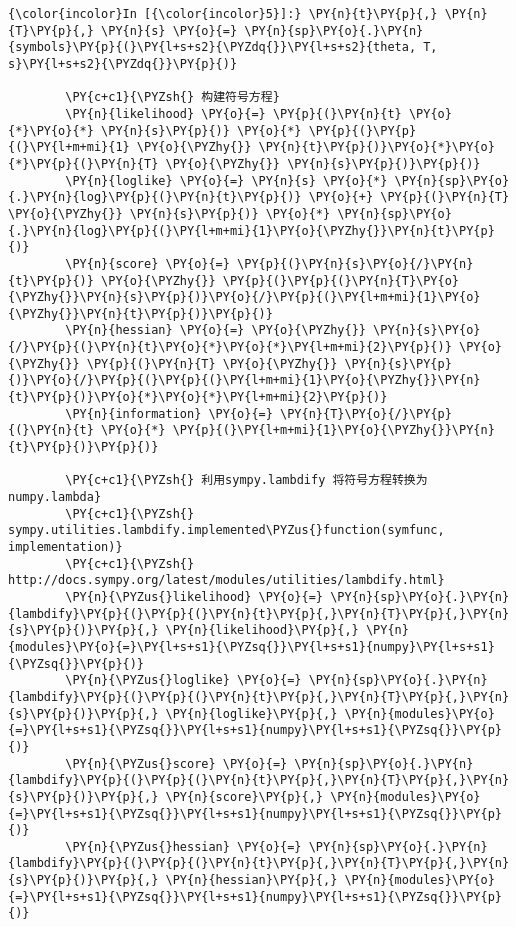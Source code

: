     \begin{Verbatim}[commandchars=\\\{\}]
{\color{incolor}In [{\color{incolor}5}]:} \PY{n}{t}\PY{p}{,} \PY{n}{T}\PY{p}{,} \PY{n}{s} \PY{o}{=} \PY{n}{sp}\PY{o}{.}\PY{n}{symbols}\PY{p}{(}\PY{l+s+s2}{\PYZdq{}}\PY{l+s+s2}{theta, T, s}\PY{l+s+s2}{\PYZdq{}}\PY{p}{)}

        \PY{c+c1}{\PYZsh{} 构建符号方程}
        \PY{n}{likelihood} \PY{o}{=} \PY{p}{(}\PY{n}{t} \PY{o}{*}\PY{o}{*} \PY{n}{s}\PY{p}{)} \PY{o}{*} \PY{p}{(}\PY{p}{(}\PY{l+m+mi}{1} \PY{o}{\PYZhy{}} \PY{n}{t}\PY{p}{)}\PY{o}{*}\PY{o}{*}\PY{p}{(}\PY{n}{T} \PY{o}{\PYZhy{}} \PY{n}{s}\PY{p}{)}\PY{p}{)}
        \PY{n}{loglike} \PY{o}{=} \PY{n}{s} \PY{o}{*} \PY{n}{sp}\PY{o}{.}\PY{n}{log}\PY{p}{(}\PY{n}{t}\PY{p}{)} \PY{o}{+} \PY{p}{(}\PY{n}{T} \PY{o}{\PYZhy{}} \PY{n}{s}\PY{p}{)} \PY{o}{*} \PY{n}{sp}\PY{o}{.}\PY{n}{log}\PY{p}{(}\PY{l+m+mi}{1}\PY{o}{\PYZhy{}}\PY{n}{t}\PY{p}{)}
        \PY{n}{score} \PY{o}{=} \PY{p}{(}\PY{n}{s}\PY{o}{/}\PY{n}{t}\PY{p}{)} \PY{o}{\PYZhy{}} \PY{p}{(}\PY{p}{(}\PY{n}{T}\PY{o}{\PYZhy{}}\PY{n}{s}\PY{p}{)}\PY{o}{/}\PY{p}{(}\PY{l+m+mi}{1}\PY{o}{\PYZhy{}}\PY{n}{t}\PY{p}{)}\PY{p}{)}
        \PY{n}{hessian} \PY{o}{=} \PY{o}{\PYZhy{}} \PY{n}{s}\PY{o}{/}\PY{p}{(}\PY{n}{t}\PY{o}{*}\PY{o}{*}\PY{l+m+mi}{2}\PY{p}{)} \PY{o}{\PYZhy{}} \PY{p}{(}\PY{n}{T} \PY{o}{\PYZhy{}} \PY{n}{s}\PY{p}{)}\PY{o}{/}\PY{p}{(}\PY{p}{(}\PY{l+m+mi}{1}\PY{o}{\PYZhy{}}\PY{n}{t}\PY{p}{)}\PY{o}{*}\PY{o}{*}\PY{l+m+mi}{2}\PY{p}{)}
        \PY{n}{information} \PY{o}{=} \PY{n}{T}\PY{o}{/}\PY{p}{(}\PY{n}{t} \PY{o}{*} \PY{p}{(}\PY{l+m+mi}{1}\PY{o}{\PYZhy{}}\PY{n}{t}\PY{p}{)}\PY{p}{)}

        \PY{c+c1}{\PYZsh{} 利用sympy.lambdify 将符号方程转换为numpy.lambda}
        \PY{c+c1}{\PYZsh{} sympy.utilities.lambdify.implemented\PYZus{}function(symfunc, implementation)}
        \PY{c+c1}{\PYZsh{} http://docs.sympy.org/latest/modules/utilities/lambdify.html}
        \PY{n}{\PYZus{}likelihood} \PY{o}{=} \PY{n}{sp}\PY{o}{.}\PY{n}{lambdify}\PY{p}{(}\PY{p}{(}\PY{n}{t}\PY{p}{,}\PY{n}{T}\PY{p}{,}\PY{n}{s}\PY{p}{)}\PY{p}{,} \PY{n}{likelihood}\PY{p}{,} \PY{n}{modules}\PY{o}{=}\PY{l+s+s1}{\PYZsq{}}\PY{l+s+s1}{numpy}\PY{l+s+s1}{\PYZsq{}}\PY{p}{)}
        \PY{n}{\PYZus{}loglike} \PY{o}{=} \PY{n}{sp}\PY{o}{.}\PY{n}{lambdify}\PY{p}{(}\PY{p}{(}\PY{n}{t}\PY{p}{,}\PY{n}{T}\PY{p}{,}\PY{n}{s}\PY{p}{)}\PY{p}{,} \PY{n}{loglike}\PY{p}{,} \PY{n}{modules}\PY{o}{=}\PY{l+s+s1}{\PYZsq{}}\PY{l+s+s1}{numpy}\PY{l+s+s1}{\PYZsq{}}\PY{p}{)}
        \PY{n}{\PYZus{}score} \PY{o}{=} \PY{n}{sp}\PY{o}{.}\PY{n}{lambdify}\PY{p}{(}\PY{p}{(}\PY{n}{t}\PY{p}{,}\PY{n}{T}\PY{p}{,}\PY{n}{s}\PY{p}{)}\PY{p}{,} \PY{n}{score}\PY{p}{,} \PY{n}{modules}\PY{o}{=}\PY{l+s+s1}{\PYZsq{}}\PY{l+s+s1}{numpy}\PY{l+s+s1}{\PYZsq{}}\PY{p}{)}
        \PY{n}{\PYZus{}hessian} \PY{o}{=} \PY{n}{sp}\PY{o}{.}\PY{n}{lambdify}\PY{p}{(}\PY{p}{(}\PY{n}{t}\PY{p}{,}\PY{n}{T}\PY{p}{,}\PY{n}{s}\PY{p}{)}\PY{p}{,} \PY{n}{hessian}\PY{p}{,} \PY{n}{modules}\PY{o}{=}\PY{l+s+s1}{\PYZsq{}}\PY{l+s+s1}{numpy}\PY{l+s+s1}{\PYZsq{}}\PY{p}{)}
\end{Verbatim}

